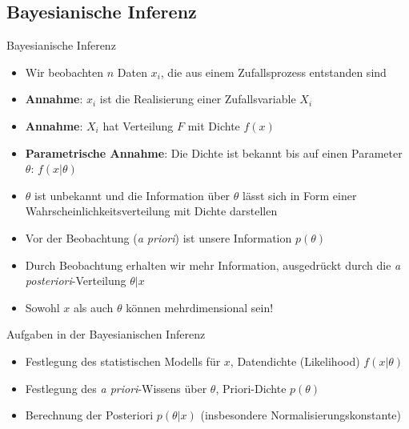\documentclass[german]{beamer}
\numberwithin{Bsp}{section}
\numberwithin{Def}{section}
\numberwithin{Stz}{section}
\begin{document}
\subsection{Bayesianische Inferenz}
\begin{frame}{Bayesianische Inferenz}
\begin{itemize}
\item Wir beobachten $n$ Daten $x_i$, die aus einem Zufallsprozess entstanden sind
\item \textbf{Annahme}: $x_i$ ist die Realisierung einer Zufallsvariable $X_i$
\item \textbf{Annahme}: $X_i$ hat Verteilung $F$ mit Dichte $f(x)$
\item \textbf{Parametrische Annahme}: Die Dichte ist bekannt bis auf einen Parameter $\theta$: $f(x|\theta)$
\item $\theta$ ist unbekannt und die Information über $\theta$ lässt sich in Form einer Wahrscheinlichkeitsverteilung mit Dichte darstellen
\item Vor der Beobachtung (\textit{a priori}) ist unsere Information $p(\theta)$ 
\item Durch Beobachtung erhalten wir mehr Information, ausgedrückt durch die \textit{a posteriori}-Verteilung $\theta|x$
\item Sowohl $x$ als auch $\theta$ können mehrdimensional sein!
\end{itemize}
\end{frame}

\begin{frame}{Aufgaben in der Bayesianischen Inferenz}
\begin{itemize}
\item Festlegung des statistischen Modells für $x$, Datendichte (Likelihood) $f(x|\theta)$ 
\item Festlegung des \textit{a priori}-Wissens über $\theta$, Priori-Dichte $p(\theta)$  
\item Berechnung der Posteriori $p(\theta|x)$ (insbesondere Normalisierungskonstante)
\end{itemize}
\end{frame}
\end{document}
